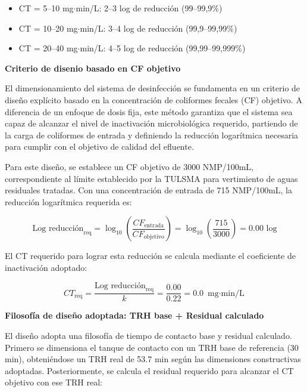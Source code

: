 \documentclass[12pt,a4paper]{article}
\begin{document}
\begin{itemize}[noitemsep,leftmargin=2em]
    \item CT = 5--10 mg$\cdot$min/L: 2--3 log de reducción (99--99,9\%)
    \item CT = 10--20 mg$\cdot$min/L: 3--4 log de reducción (99,9--99,99\%)
    \item CT = 20--40 mg$\cdot$min/L: 4--5 log de reducción (99,99--99,999\%)
\end{itemize}

\textbf{Criterio de disenio basado en CF objetivo}

El dimensionamiento del sistema de desinfección se fundamenta en un criterio de diseño explícito basado en la concentración de coliformes fecales (CF) objetivo. A diferencia de un enfoque de dosis fija, este método garantiza que el sistema sea capaz de alcanzar el nivel de inactivación microbiológica requerido, partiendo de la carga de coliformes de entrada y definiendo la reducción logarítmica necesaria para cumplir con el objetivo de calidad del efluente.

Para este diseño, se establece un CF objetivo de 3000 NMP/100mL, correspondiente al límite establecido por la TULSMA para vertimiento de aguas residuales tratadas. Con una concentración de entrada de 715 NMP/100mL, la reducción logarítmica requerida es:

\begin{equation}
\text{Log reducción}_{\text{req}} = \log_{10}\left(\frac{CF_{\text{entrada}}}{CF_{\text{objetivo}}}\right) = \log_{10}\left(\frac{715}{3000}\right) = 0.00 \text{ log}
\end{equation}

El CT requerido para lograr esta reducción se calcula mediante el coeficiente de inactivación adoptado:

\begin{equation}
CT_{\text{req}} = \frac{\text{Log reducción}_{\text{req}}}{k} = \frac{0.00}{0.22} = 0.0 \text{ mg$\cdot$min/L}
\end{equation}

\textbf{Filosofía de diseño adoptada: TRH base + Residual calculado}

El diseño adopta una filosofía de tiempo de contacto base y residual calculado. Primero se dimensiona el tanque de contacto con un TRH base de referencia (30 min), obteniéndose un TRH real de 53.7 min según las dimensiones constructivas adoptadas. Posteriormente, se calcula el residual requerido para alcanzar el CT objetivo con ese TRH real:
\end{document}
